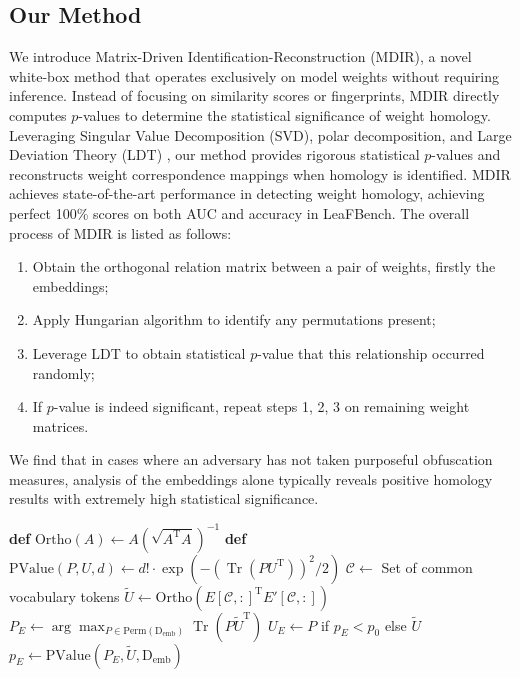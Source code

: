 \documentclass{article} %
\DeclareMathOperator{\Tr}{Tr}
\begin{document}
\subsection{Our Method} 
We introduce Matrix-Driven Identification-Reconstruction (MDIR), a novel white-box method that operates exclusively on model weights without requiring inference. Instead of focusing on similarity scores or fingerprints, MDIR directly computes $p$-values to determine the statistical significance of weight homology. Leveraging Singular Value Decomposition (SVD), polar decomposition, and Large Deviation Theory (LDT) \citep{DemboZeitouni1998}, our method provides rigorous statistical $p$-values and reconstructs weight correspondence mappings when homology is identified. MDIR achieves state-of-the-art performance in detecting weight homology, achieving perfect 100\% scores on both AUC and accuracy in LeaFBench.
The overall process of MDIR is listed as follows:
\begin{enumerate}
    \item Obtain the orthogonal relation matrix between a pair of weights, firstly the embeddings;
    \item Apply Hungarian algorithm to identify any permutations present;
    \item Leverage LDT to obtain statistical $p$-value that this relationship occurred randomly;
    \item If $p$-value is indeed significant, repeat steps 1, 2, 3 on remaining weight matrices.
\end{enumerate}

We find that in cases where an adversary has not taken purposeful obfuscation measures, analysis of the embeddings alone typically reveals positive homology results with extremely high statistical significance.

\begin{algorithm}[htbp]
    \caption{MDIR on embeddings $E, E'$}
    \label{alg:embed}
    \begin{algorithmic}[1]
    \State \textbf{def} $\mathrm{Ortho}(A) \gets A(\sqrt{A^\text{T} A})^{-1}$
    \State \textbf{def} $\mathrm{PValue}(P, U, d) \gets d! \cdot \exp(-(\Tr(P U^{\text{T}}))^2 / 2)$
    \State $\mathcal{C} \gets $ Set of common vocabulary tokens
    \State $\tilde{U} \gets \mathrm{Ortho}(E[\mathcal{C}, :]^{\text{T}} E'[\mathcal{C}, :])$
    \State $P_E \gets \arg\max_{P \in \mathrm{Perm}(\mathrm{D_{emb}})} \Tr(P \tilde{U}^{\text{T}})$
    \State $U_E \gets P$ if $p_E < p_0$ else $\tilde{U}$
    \State $p_E \gets \mathrm{PValue}(P_E, \tilde{U}, \mathrm{D_{emb}})$
    \end{algorithmic}
\end{algorithm}
\end{document}
